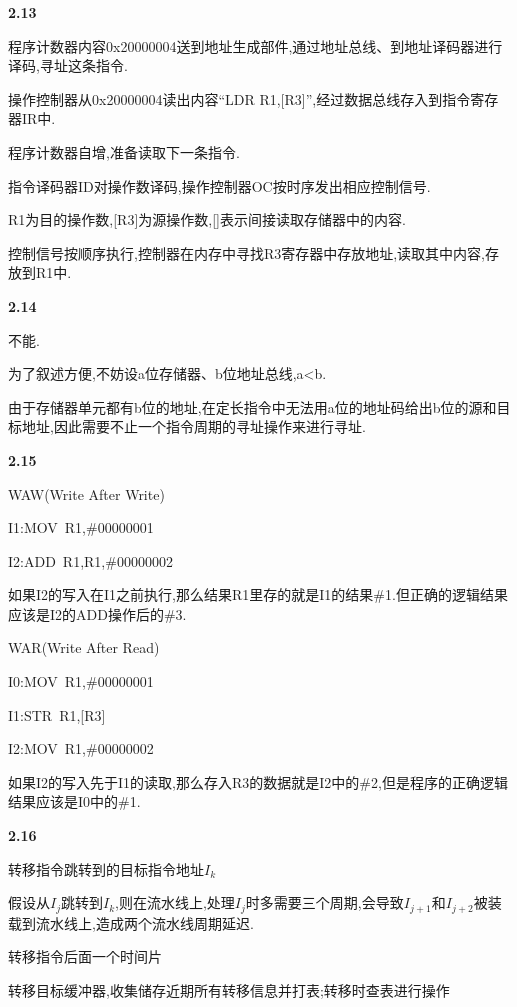 \documentclass{article}
\begin{document}
    \noindent\textbf{2.13}\par
    程序计数器内容0x20000004送到地址生成部件,通过地址总线、到地址译码器进行译码,寻址这条指令.\par
    操作控制器从0x20000004读出内容“LDR R1,[R3]”,经过数据总线存入到指令寄存器IR中.\par
    程序计数器自增,准备读取下一条指令.\par
    指令译码器ID对操作数译码,操作控制器OC按时序发出相应控制信号.\par
    R1为目的操作数,[R3]为源操作数,[]表示间接读取存储器中的内容.\par
    控制信号按顺序执行,控制器在内存中寻找R3寄存器中存放地址,读取其中内容,存放到R1中.
    \\[4pt]\par

    \noindent\textbf{2.14}\par
    不能.\par
    为了叙述方便,不妨设a位存储器、b位地址总线,a<b.\par
    由于存储器单元都有b位的地址,在定长指令中无法用a位的地址码给出b位的源和目标地址,因此需要不止一个指令周期的寻址操作来进行寻址.
    \\[4pt]\par

    \noindent\textbf{2.15}\par
    WAW(Write After Write)\par
    \qquad I1:\qquad MOV\ R1,\#00000001\par
    \qquad I2:\qquad ADD\ R1,R1,\#00000002\par
    如果I2的写入在I1之前执行,那么结果R1里存的就是I1的结果\#1.但正确的逻辑结果应该是I2的ADD操作后的\#3.\\[2pt]\par
    WAR(Write After Read)\par
    \qquad I0:\qquad MOV\ R1,\#00000001\par
    \qquad I1:\qquad STR\ R1,[R3]\par
    \qquad I2:\qquad MOV\ R1,\#00000002\par
    如果I2的写入先于I1的读取,那么存入R3的数据就是I2中的\#2,但是程序的正确逻辑结果应该是I0中的\#1.
    \\[4pt]\par

    \noindent\textbf{2.16}\par
    转移指令跳转到的目标指令地址$I_k$\par
    假设从$I_j$跳转到$I_k$,则在流水线上,处理$I_j$时多需要三个周期,会导致$I_{j+1}$和$I_{j+2}$被装载到流水线上,造成两个流水线周期延迟.\par
    转移指令后面一个时间片\par
    转移目标缓冲器,收集储存近期所有转移信息并打表;转移时查表进行操作
    \\[4pt]\par
\end{document}
